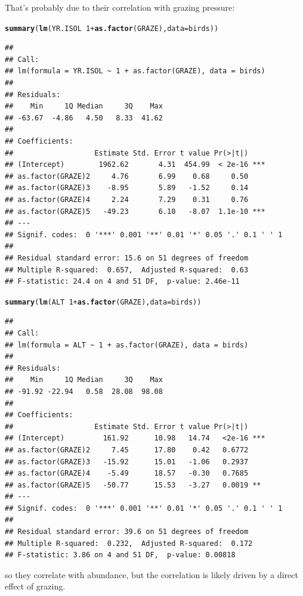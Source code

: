 \documentclass[12pt,a4paper]{scrartcl}\usepackage[]{graphicx}\usepackage[]{color}
\makeatletter
\newcommand{\hlnum}[1]{\textcolor[rgb]{0.686,0.059,0.569}{#1}}%
\newcommand{\hlopt}[1]{\textcolor[rgb]{0,0,0}{#1}}%
\newcommand{\hlstd}[1]{\textcolor[rgb]{0.345,0.345,0.345}{#1}}%
\newcommand{\hlkwc}[1]{\textcolor[rgb]{0.333,0.667,0.333}{#1}}%
\newcommand{\hlkwd}[1]{\textcolor[rgb]{0.737,0.353,0.396}{\textbf{#1}}}%
\newenvironment{kframe}{%
 \def\at@end@of@kframe{}%
 \ifinner\ifhmode%
  \def\at@end@of@kframe{\end{minipage}}%
  \begin{minipage}{\columnwidth}%
 \fi\fi%
 \def\FrameCommand##1{\hskip\@totalleftmargin \hskip-\fboxsep
 \colorbox{shadecolor}{##1}\hskip-\fboxsep
     \hskip-\linewidth \hskip-\@totalleftmargin \hskip\columnwidth}%
 \MakeFramed {\advance\hsize-\width
   \@totalleftmargin\z@ \linewidth\hsize
   \@setminipage}}%
 {\par\unskip\endMakeFramed%
 \at@end@of@kframe}
\newenvironment{knitrout}{}{} %
\makeatother
\begin{document}
\begin{Answer}
That's probably due to their correlation with grazing pressure:
\begin{knitrout}
\color{fgcolor}\begin{kframe}
\begin{alltt}
\hlkwd{summary}\hlstd{(}\hlkwd{lm}\hlstd{(YR.ISOL} \hlopt{~} \hlnum{1} \hlopt{+} \hlkwd{as.factor}\hlstd{(GRAZE) ,} \hlkwc{data} \hlstd{= birds))}
\end{alltt}
\begin{verbatim}
## 
## Call:
## lm(formula = YR.ISOL ~ 1 + as.factor(GRAZE), data = birds)
## 
## Residuals:
##    Min     1Q Median     3Q    Max 
## -63.67  -4.86   4.50   8.33  41.62 
## 
## Coefficients:
##                   Estimate Std. Error t value Pr(>|t|)    
## (Intercept)        1962.62       4.31  454.99  < 2e-16 ***
## as.factor(GRAZE)2     4.76       6.99    0.68     0.50    
## as.factor(GRAZE)3    -8.95       5.89   -1.52     0.14    
## as.factor(GRAZE)4     2.24       7.29    0.31     0.76    
## as.factor(GRAZE)5   -49.23       6.10   -8.07  1.1e-10 ***
## ---
## Signif. codes:  0 '***' 0.001 '**' 0.01 '*' 0.05 '.' 0.1 ' ' 1
## 
## Residual standard error: 15.6 on 51 degrees of freedom
## Multiple R-squared:  0.657,	Adjusted R-squared:  0.63 
## F-statistic: 24.4 on 4 and 51 DF,  p-value: 2.46e-11
\end{verbatim}
\begin{alltt}
\hlkwd{summary}\hlstd{(}\hlkwd{lm}\hlstd{(ALT} \hlopt{~} \hlnum{1} \hlopt{+} \hlkwd{as.factor}\hlstd{(GRAZE),} \hlkwc{data} \hlstd{= birds))}
\end{alltt}
\begin{verbatim}
## 
## Call:
## lm(formula = ALT ~ 1 + as.factor(GRAZE), data = birds)
## 
## Residuals:
##    Min     1Q Median     3Q    Max 
## -91.92 -22.94   0.58  28.08  98.08 
## 
## Coefficients:
##                   Estimate Std. Error t value Pr(>|t|)    
## (Intercept)         161.92      10.98   14.74   <2e-16 ***
## as.factor(GRAZE)2     7.45      17.80    0.42   0.6772    
## as.factor(GRAZE)3   -15.92      15.01   -1.06   0.2937    
## as.factor(GRAZE)4    -5.49      18.57   -0.30   0.7685    
## as.factor(GRAZE)5   -50.77      15.53   -3.27   0.0019 ** 
## ---
## Signif. codes:  0 '***' 0.001 '**' 0.01 '*' 0.05 '.' 0.1 ' ' 1
## 
## Residual standard error: 39.6 on 51 degrees of freedom
## Multiple R-squared:  0.232,	Adjusted R-squared:  0.172 
## F-statistic: 3.86 on 4 and 51 DF,  p-value: 0.00818
\end{verbatim}
\end{kframe}
\end{knitrout}
so they correlate with abundance, but the correlation is likely driven by a direct effect of grazing.

\end{Answer}
\end{document}
